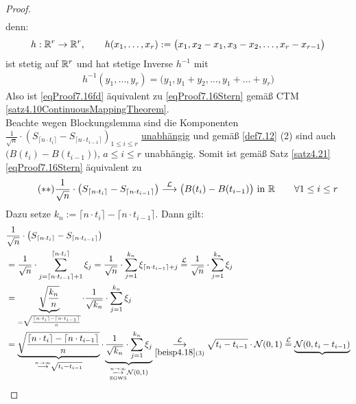 \begin{proof}
\begin{align}
	\end{align}
	denn:
	\begin{align*}
		h:\mathbb{R}^r\to\mathbb{R}^r,\qquad h(x_1,\ldots,x_r):=\big(x_1,x_2-x_1,x_3-x_2,\ldots,x_r-x_{r-1}\big)
	\end{align*}
	ist stetig auf $\mathbb{R}^r$ und hat stetige Inverse $h^{-1}$ mit 
	\begin{align*}
		h^{-1}(y_1,\ldots,y_r)=\big(y_1,y_1+y_2,\ldots,y_1+\ldots+y_r\big)
	\end{align*}
	Also ist \eqref{eqProof7.16fd} äquivalent zu \eqref{eqProof7.16Stern} gemäß CTM \ref{satz4.10ContinuousMappingTheorem}.\\
	Beachte wegen Blockungslemma sind die Komponenten $\frac{1}{\sqrt{n}}\cdot\left(S_{\lceil n\cdot t_i\rceil}-S_{\lceil n\cdot t_{i-1}\rceil}\right)_{1\leq i\leq r}$ \underline{unabhängig} und gemäß \ref{def7.12} (2) sind auch $\big(B(t_i)-B(t_{i-1})\big)$, $a\leq i\leq r$ unabhängig. 
	Somit ist gemäß Satz \ref{satz4.21} \eqref{eqProof7.16Stern} äquivalent zu 
	\begin{align}\label{eqProof7.16SternStern}\tag{$\ast\ast$}
		\frac{1}{\sqrt{n}}\cdot\left(S_{\lceil n\cdot t_i\rceil}-S_{\lceil n\cdot t_{i-1}\rceil}\right)
		\stackrel{\mathcal{L}}{\longrightarrow}
		\big(B(t_i)-B(t_{i-1})\big)\text{ in }\mathbb{R}\qquad\forall 1\leq i\leq r
	\end{align}
	Dazu setze $k_n:=\lceil n\cdot t_i\rceil-\lceil n\cdot t_{i-1}\rceil$. Dann gilt:
	\begin{align*}
		&\frac{1}{\sqrt{n}}\cdot\left(S_{\lceil n\cdot t_i\rceil}-S_{\lceil n\cdot t_{i-1}\rceil}\right)\\
		&=\frac{1}{\sqrt{n}}\cdot\sum\limits_{j=\lceil n\cdot t_{i-1}\rceil+1}^{\lceil n\cdot t_i\rceil}\xi_j
		=\frac{1}{\sqrt{n}}\cdot\sum\limits_{j=1}^{k_n}\xi_{\lceil n\cdot t_{i-1}\rceil+j}
		\overset{\mathcal{L}}{=}
		\frac{1}{\sqrt{n}}\cdot\sum\limits_{j=1}^{k_n}\xi_j\\
		&=\underbrace{\sqrt{\frac{k_n}{n}}}_{=\sqrt{\frac{\lceil n\cdot t_i\rceil-\lceil n\cdot t_{i-1}\rceil}{n}}}\cdot\frac{1}{\sqrt{k_n}}\cdot\sum\limits_{j=1}^{k_n}\xi_j\\
		&=\underbrace{\sqrt{\frac{\lceil n\cdot t_i\rceil-\lceil n\cdot t_{i-1}\rceil}{n}}}_{\stackrel{n\to\infty}{\longrightarrow}\sqrt{t_i-t_{i-1}}}\cdot\underbrace{\frac{1}{\sqrt{k_n}}\cdot\sum\limits_{j=1}^{k_n}\xi_j}_{\underset{\text{ZGWS}}{\overset{n\to\infty}{\longrightarrow}}\mathcal{N}(0,1)}\underset{\ref{beisp4.18}(3)}{\overset{\mathcal{L}}{\longrightarrow}}\sqrt{t_i-t_{i-1}}\cdot\mathcal{N}(0,1)
		\overset{\mathcal{L}}{=}\underbrace{\mathcal{N}(0,t_i-t_{i-1})}_{
}
\end{align*}
\end{proof}
